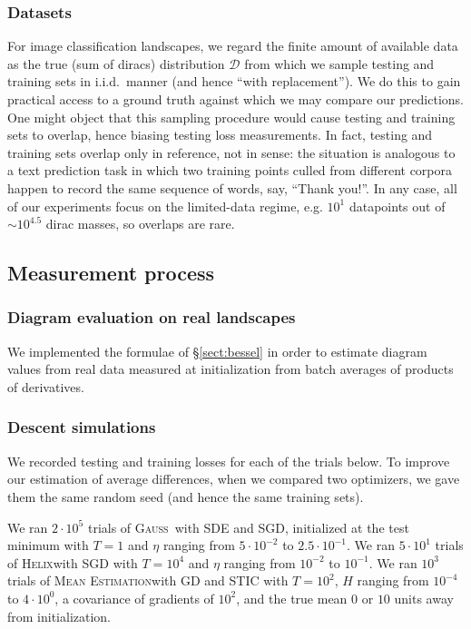 \documentclass[anon,12pt]{colt2021} %
\newcommand{\Dd}{\mathcal{D}}
\newcommand{\Gauss}{\textsc{Gauss}}
\newcommand{\Helix}{\textsc{Helix}}
\newcommand{\MeanEstimation}{\textsc{Mean Estimation}}
\begin{document}
        \subsubsection{Datasets}
            For image classification landscapes, we regard the finite amount of
            available data as the true (sum of diracs) distribution $\Dd$ from
            which we sample testing and training sets in i.i.d.\ manner (and hence
            ``with replacement'').  We do this to gain practical access to a
            ground truth against which we may compare our predictions.  One
            might object that this sampling procedure would cause testing and
            training sets to overlap, hence biasing testing loss measurements.  In
            fact, testing and training sets overlap only in reference, not in
            sense: the situation is analogous to a text prediction task in
            which two training points culled from different corpora happen to
            record the same sequence of words, say, ``Thank you!''.  In any
            case, all of our experiments focus on the limited-data regime, e.g.
            $10^1$ datapoints out of $\sim 10^{4.5}$ dirac masses, so overlaps
            are rare.

    \subsection{Measurement process}                                \label{appendix:measure}

        \subsubsection{Diagram evaluation on real landscapes}
            We implemented the formulae of \S\ref{sect:bessel} in order
            to estimate diagram values from real data measured at
            initialization from batch averages of products of derivatives.

        \subsubsection{Descent simulations}
            We recorded testing and training losses for each of the trials below.  To
            improve our estimation of average differences, when we compared two
            optimizers, we gave them the same random seed (and hence the same
            training sets).

            We ran $2 \cdot 10^5$ trials of \Gauss\, with SDE and SGD,
            initialized at the test minimum with $T=1$ and $\eta$ ranging from
            $5\cdot 10^{-2}$ to $2.5\cdot 10^{-1}$.
            We ran $5 \cdot 10^1$ trials of \Helix with SGD with $T=10^4$
            and $\eta$ ranging from $10^{-2}$ to $10^{-1}$.
            We ran $10^3$ trials of \MeanEstimation with GD and STIC
            with $T=10^2$, $H$ ranging from $10^{-4}$ to $4 \cdot 10^0$,
            a covariance of gradients of $10^2$, and the true mean $0$ or
            $10$ units away from initialization.
\end{document}
